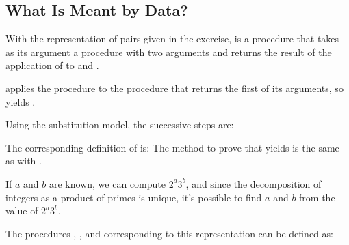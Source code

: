 \subsection{What Is Meant by Data?}

\begin{exe}[2.4]
    With the representation of pairs given in the exercise,  is 
    a procedure that takes as its argument a procedure  with two 
    arguments and returns the result of the application of  to  
    and .

     applies the procedure  to the procedure that 
    returns the first of its arguments, so  yields 
    .

    Using the substitution model, the successive steps are:

    The corresponding definition of  is:
    The method to prove that  yields  is the same 
    as with .
\end{exe}

\begin{exe}[2.5]
    If $a$ and $b$ are known, we can compute $2^a 3^b$, and since the 
    decomposition of integers as a product of primes is unique, it’s possible to 
    find $a$ and $b$ from the value of $2^a 3^b$.

    The procedures , , and  corresponding to this 
    representation can be defined as:
\end{exe}

